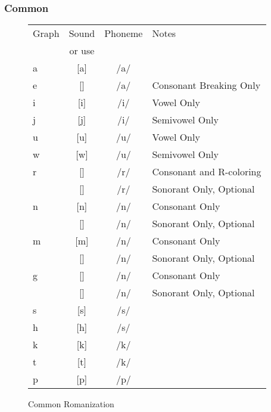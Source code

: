 \documentclass[11pt,letterpaper]{article}
\newcommand{\epsi}{\textipa{E}}
\newcommand{\engma}{\textipa{N}}
\begin{document}
		\subsubsection{Common}
		\begin{wrapfigure}{l}{0.575\textwidth}
  			\begin{tabular}{|l|c|c|l|}
  				\hline
  				Graph      & Sound     & Phoneme & Notes\\
  				           & or use    &         &      \\ \hline \hline
  				\textlangle{}a\textrangle{}        & [a]       & /a/     &      \\
  				\textlangle{}e\textrangle{}        & [\epsi]   & /a/     & Consonant Breaking Only \\
  				\textlangle{}i\textrangle{}        & [i]       & /i/     & Vowel Only \\
  				\textlangle{}j\textrangle{}        & [j]       & /i/     & Semivowel Only \\
  				\textlangle{}u\textrangle{}        & [u]       & /u/     & Vowel Only \\
  				\textlangle{}w\textrangle{}        & [w]       & /u/     & Semivowel Only \\
  				\textlangle{}r\textrangle{}        & [\flap]   & /r/     & Consonant and R-coloring \\
  				\textlangle{}\s{r}\textrangle{}    & [\rson]   & /r/     & Sonorant Only, Optional \\
				\textlangle{}n\textrangle{}        & [n]       & /n/     & Consonant Only \\
				\textlangle{}\nson\textrangle{}    & [\nson]   & /n/     & Sonorant Only, Optional \\ 
				\textlangle{}m\textrangle{}        & [m]       & /n/     & Consonant Only \\
				\textlangle{}\mson\textrangle{}    & [\mson]   & /n/     & Sonorant Only, Optional \\ 				
				\textlangle{}g\textrangle{}        & [\engma]  & /n/     & Consonant Only \\
				\textlangle{}\s{g}\textrangle{}    & [\engson] & /n/     & Sonorant Only, Optional \\
				\textlangle{}s\textrangle{}        & [s]       & /s/     &   \\
				\textlangle{}h\textrangle{}        & [h]       & /s/     &   \\
				\textlangle{}k\textrangle{}        & [k]       & /k/     &   \\
				\textlangle{}t\textrangle{}        & [t]       & /k/     &   \\ 
  				\textlangle{}p\textrangle{}        & [p]       & /p/     &   \\ \hline        
  			\end{tabular}
  			\caption{Common Romanization}
		\end{wrapfigure}
\end{document}
